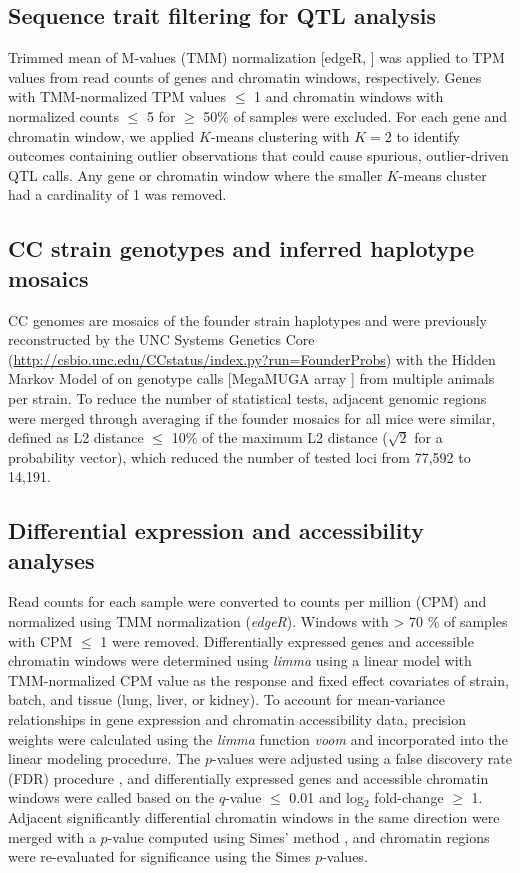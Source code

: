 \documentclass[9pt,twocolumn,twoside]{gsajnl}
\begin{document}
\subsection{Sequence trait filtering for QTL analysis}

Trimmed mean of M-values (TMM) normalization [edgeR, \citep{edgeR}] was applied to TPM values from read counts of genes and chromatin windows, respectively. Genes with TMM-normalized TPM values $\leq$ 1 and chromatin windows with normalized counts $\leq$ 5 for $\geq$ 50\% of samples were excluded. For each gene and chromatin window, we applied $K$-means clustering with $K=2$ to identify outcomes containing outlier observations that could cause spurious, outlier-driven QTL calls. Any gene or chromatin window where the smaller $K$-means cluster had a cardinality of 1 was removed.

\subsection{CC strain genotypes and inferred haplotype mosaics}

CC genomes are mosaics of the founder strain haplotypes and were previously reconstructed by the UNC Systems Genetics Core (\url{http://csbio.unc.edu/CCstatus/index.py?run=FounderProbs}) with the Hidden Markov Model of \cite{Fu2012} on genotype calls [MegaMUGA array \citep{Morgan2016muga}] from multiple animals per strain. To reduce the number of statistical tests, adjacent genomic regions were merged through averaging if the founder mosaics for all mice were similar, defined as L2 distance $\leq$ 10\% of the maximum L2 distance ($\sqrt{2}$ for a probability vector), which reduced the number of tested loci from 77,592 to 14,191.

\subsection{Differential expression and accessibility analyses}

Read counts for each sample were converted to counts per million (CPM) and normalized using TMM normalization (\textit{edgeR}). Windows with > 70 \% of samples with CPM $\leq$ 1 were removed. Differentially expressed genes and accessible chromatin windows were determined using \textit{limma} \citep{limma} using a linear model with TMM-normalized CPM value as the response and fixed effect covariates of strain, batch, and tissue (lung, liver, or kidney). 
To account for mean-variance relationships in gene expression and chromatin accessibility data, precision weights were calculated using the \textit{limma} function \textit{voom} and incorporated into the linear modeling procedure. The $p$-values were adjusted using a false discovery rate (FDR) procedure \citep{Benjamini1995}, and differentially expressed genes and accessible chromatin windows were called based on the $q$-value $\le$ 0.01 and log$_{2}$ fold-change $\geq$ 1. Adjacent significantly differential chromatin windows in the same direction were merged with a $p$-value computed using Simes' method \citep{Sarkar1997}, and chromatin regions were re-evaluated for significance using the Simes $p$-values.
\end{document}
